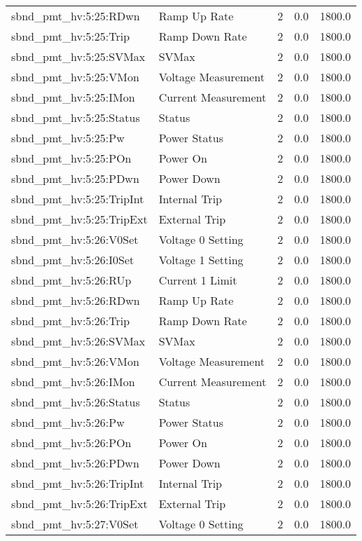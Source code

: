 \begin{center}
\begin{longtable}{l | l l l l }
sbnd\_pmt\_hv:5:25:RDwn & Ramp Up Rate & 2 & 0.0 & 1800.0\\ 
sbnd\_pmt\_hv:5:25:Trip & Ramp Down Rate & 2 & 0.0 & 1800.0\\ 
sbnd\_pmt\_hv:5:25:SVMax & SVMax & 2 & 0.0 & 1800.0\\ 
sbnd\_pmt\_hv:5:25:VMon & Voltage Measurement & 2 & 0.0 & 1800.0\\ 
sbnd\_pmt\_hv:5:25:IMon & Current Measurement & 2 & 0.0 & 1800.0\\ 
sbnd\_pmt\_hv:5:25:Status & Status & 2 & 0.0 & 1800.0\\ 
sbnd\_pmt\_hv:5:25:Pw & Power Status & 2 & 0.0 & 1800.0\\ 
sbnd\_pmt\_hv:5:25:POn & Power On & 2 & 0.0 & 1800.0\\ 
sbnd\_pmt\_hv:5:25:PDwn & Power Down & 2 & 0.0 & 1800.0\\ 
sbnd\_pmt\_hv:5:25:TripInt & Internal Trip & 2 & 0.0 & 1800.0\\ 
sbnd\_pmt\_hv:5:25:TripExt & External Trip & 2 & 0.0 & 1800.0\\ 
sbnd\_pmt\_hv:5:26:V0Set & Voltage 0 Setting & 2 & 0.0 & 1800.0\\ 
sbnd\_pmt\_hv:5:26:I0Set & Voltage 1 Setting & 2 & 0.0 & 1800.0\\ 
sbnd\_pmt\_hv:5:26:RUp & Current 1 Limit & 2 & 0.0 & 1800.0\\ 
sbnd\_pmt\_hv:5:26:RDwn & Ramp Up Rate & 2 & 0.0 & 1800.0\\ 
sbnd\_pmt\_hv:5:26:Trip & Ramp Down Rate & 2 & 0.0 & 1800.0\\ 
sbnd\_pmt\_hv:5:26:SVMax & SVMax & 2 & 0.0 & 1800.0\\ 
sbnd\_pmt\_hv:5:26:VMon & Voltage Measurement & 2 & 0.0 & 1800.0\\ 
sbnd\_pmt\_hv:5:26:IMon & Current Measurement & 2 & 0.0 & 1800.0\\ 
sbnd\_pmt\_hv:5:26:Status & Status & 2 & 0.0 & 1800.0\\ 
sbnd\_pmt\_hv:5:26:Pw & Power Status & 2 & 0.0 & 1800.0\\ 
sbnd\_pmt\_hv:5:26:POn & Power On & 2 & 0.0 & 1800.0\\ 
sbnd\_pmt\_hv:5:26:PDwn & Power Down & 2 & 0.0 & 1800.0\\ 
sbnd\_pmt\_hv:5:26:TripInt & Internal Trip & 2 & 0.0 & 1800.0\\ 
sbnd\_pmt\_hv:5:26:TripExt & External Trip & 2 & 0.0 & 1800.0\\ 
sbnd\_pmt\_hv:5:27:V0Set & Voltage 0 Setting & 2 & 0.0 & 1800.0\\ 

\end{longtable}
\end{center}
